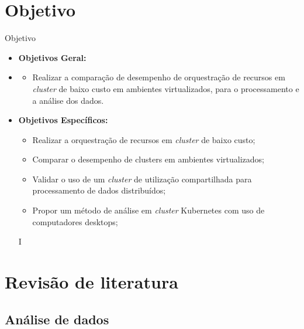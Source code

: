 \documentclass[10pt,brazil]{beamer}
\theoremstyle{definition}
\begin{document}
\section{Objetivo}
\begin{frame}[allowframebreaks]{Objetivo}
  \begin{itemize}
    \item[] \textbf{Objetivos Geral:}
    \item[]
          \begin{itemize}
            \item[] Realizar a comparação de desempenho de orquestração de recursos em \emph{cluster} de baixo custo em ambientes virtualizados, para o processamento e a análise dos dados.
          \end{itemize}
    \item[] \textbf{Objetivos Específicos:}
          \begin{itemize}
            \item Realizar a orquestração de recursos em \emph{cluster} de baixo custo;
            \item Comparar o desempenho de clusters em ambientes virtualizados;
            \item Validar o uso de um \emph{cluster} de utilização compartilhada para processamento de dados distribuídos;
            \item Propor um método de análise em \emph{cluster} Kubernetes com uso de computadores desktops;
          \end{itemize}
          I\end{itemize}
\end{frame}


\section{Revisão de literatura}

\subsection{Análise de dados}
\end{document}
